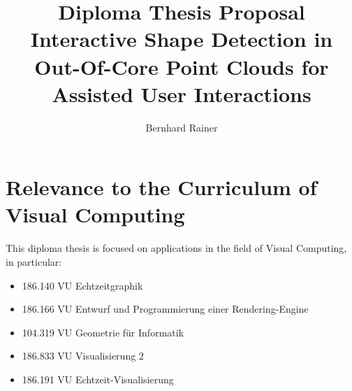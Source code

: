 \documentclass[]{article}
\title{\textbf{Diploma Thesis Proposal}\\
	\Large Interactive Shape Detection in Out-Of-Core Point Clouds for Assisted User Interactions}
\author{Bernhard Rainer}
\begin{document}
\maketitle







\newpage
\section{Relevance to the Curriculum of Visual Computing}

This diploma thesis is focused on applications in the field of Visual Computing, in particular: 

\begin{itemize}
	\item 186.140 VU Echtzeitgraphik
	\item 186.166 VU Entwurf und Programmierung einer Rendering-Engine
	\item 104.319 VU Geometrie f\"ur Informatik
	\item 186.833 VU Visualisierung 2
	\item 186.191 VU Echtzeit-Visualisierung
	
\end{itemize}



\end{document}
